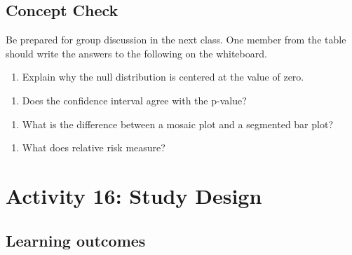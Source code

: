 \documentclass[
]{report}
\providecommand{\tightlist}{%
  \setlength{\itemsep}{0pt}\setlength{\parskip}{0pt}}
\begin{document}

\subsection{Concept Check}\label{concept-check}

Be prepared for group discussion in the next class. One member from the table should write the answers to the following on the whiteboard.

\begin{enumerate}
\def\labelenumi{\arabic{enumi}.}
\tightlist
\item
  Explain why the null distribution is centered at the value of zero.
\end{enumerate}

\vspace{0.5in}

\begin{enumerate}
\def\labelenumi{\arabic{enumi}.}
\setcounter{enumi}{1}
\tightlist
\item
  Does the confidence interval agree with the p-value?
\end{enumerate}

\vspace{0.5in}

\begin{enumerate}
\def\labelenumi{\arabic{enumi}.}
\setcounter{enumi}{2}
\tightlist
\item
  What is the difference between a mosaic plot and a segmented bar plot?
\end{enumerate}

\vspace{0.5in}

\begin{enumerate}
\def\labelenumi{\arabic{enumi}.}
\setcounter{enumi}{3}
\tightlist
\item
  What does relative risk measure?
  \newpage
\end{enumerate}

\section{Activity 16: Study Design}\label{activity-16-study-design}


\subsection{Learning outcomes}\label{learning-outcomes}
\end{document}
